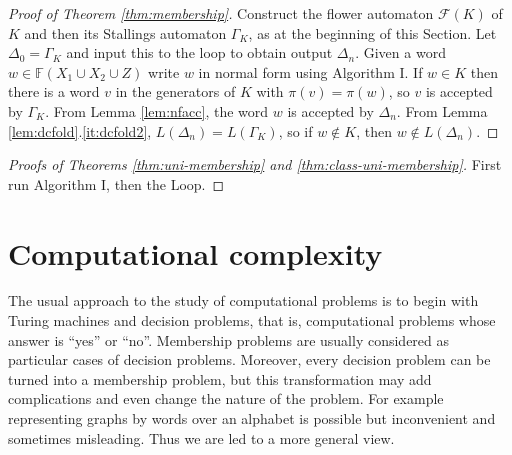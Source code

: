 \documentclass[a4paper,12pt]{article}
\newcommand{\G}{\Gamma }
\newcommand{\D}{\Delta }
\renewcommand{\L}{\Lambda }
\renewcommand{\S}{\Sigma }
\newcommand{\cA}{{\cal{A}}}
\newcommand{\cF}{{\cal{F}}}
\newtheorem{theorem}{Theorem}[section]
\numberwithin{equation}{section}
\numberwithin{figure}{section}
\newcommand{\FF}{\ensuremath{\mathbb{F}}}
\renewcommand{\cF}{\mathcal{F}}
\begin{document}

\begin{proof}[Proof of Theorem \ref{thm:membership}]
Construct the flower automaton $\cF(K)$ of $K$ and then
its Stallings automaton $\G_K$,  as at the beginning of this Section. %
Let $\D_0=\G_K$ and input this to the loop to obtain output $\D_n$.
Given a word $w\in \FF(X_1\cup X_2\cup Z)$ write $w$ in normal form
using Algorithm I. If $w\in K$ then there is a word $v$ in the generators
 of $K$ with $\pi(v)=\pi(w)$, so $v$ is accepted by $\G_K$. From
Lemma \ref{lem:nfacc}, the word $w$ is accepted by $\D_n$. From
Lemma \ref{lem:dcfold}.\ref{it:dcfold2}, $L(\D_n)=L(\G_K)$,
so if $w\notin K$, then
$w\notin L(\D_n)$.
\end{proof}
\begin{proof}[Proofs of Theorems \ref{thm:uni-membership} and 
\ref{thm:class-uni-membership}]
First run Algorithm I, then the Loop. 
\end{proof}

\section{Computational complexity}\label{sec:TC}
The usual approach to the study of computational problems is to
begin with Turing machines and decision
problems, that is, computational problems whose answer is ``yes'' or
``no''. Membership problems are usually considered as particular cases of decision problems. 
Moreover, every decision problem can be turned into a membership
problem, but this transformation may add complications and even
change the nature of the problem. For example representing graphs by
words over an alphabet is possible but inconvenient and sometimes
misleading. Thus we are led to a more general view.
\end{document}
